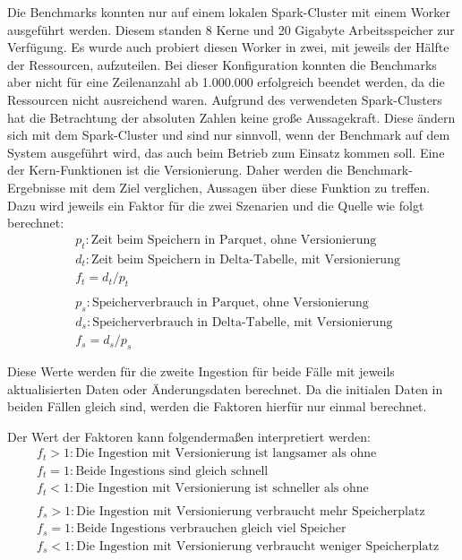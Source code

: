 Die Benchmarks konnten nur auf einem lokalen Spark-Cluster mit einem Worker ausgeführt werden.
Diesem standen 8 Kerne und 20 Gigabyte Arbeitsspeicher zur Verfügung.
Es wurde auch probiert diesen Worker in zwei, mit jeweils der Hälfte der Ressourcen, aufzuteilen.
Bei dieser Konfiguration konnten die Benchmarks aber nicht für eine Zeilenanzahl ab 1.000.000 erfolgreich beendet werden, da die Ressourcen nicht ausreichend waren.
Aufgrund des verwendeten Spark-Clusters hat die Betrachtung der absoluten Zahlen keine große Aussagekraft.
Diese ändern sich mit dem Spark-Cluster und sind nur sinnvoll, wenn der Benchmark auf dem System ausgeführt wird, das auch beim Betrieb zum Einsatz kommen soll.
Eine der Kern-Funktionen ist die Versionierung.
Daher werden die Benchmark-Ergebnisse mit dem Ziel verglichen, Aussagen über diese Funktion zu treffen.
Dazu wird jeweils ein Faktor für die zwei Szenarien und die Quelle wie folgt berechnet:
\begin{align*}
    & p_t: \text{Zeit beim Speichern in Parquet, ohne Versionierung} \\
    & d_t: \text{Zeit beim Speichern in Delta-Tabelle, mit Versionierung} \\
    & f_t = d_t / p_t \\ \\
    & p_s: \text{Speicherverbrauch in Parquet, ohne Versionierung} \\
    & d_s: \text{Speicherverbrauch in Delta-Tabelle, mit Versionierung} \\
    & f_s = d_s / p_s \\ \\
\end{align*}
Diese Werte werden für die zweite Ingestion für beide Fälle mit jeweils aktualisierten Daten oder Änderungsdaten berechnet.
Da die initialen Daten in beiden Fällen gleich sind, werden die Faktoren hierfür nur einmal berechnet.

Der Wert der Faktoren kann folgendermaßen interpretiert werden: \begin{align*} 
    & f_t > 1: \text{Die Ingestion mit Versionierung ist langsamer als ohne} \\
    & f_t = 1: \text{Beide Ingestions sind gleich schnell} \\
    & f_t < 1: \text{Die Ingestion mit Versionierung ist schneller als ohne} \\ \\
    & f_s > 1: \text{Die Ingestion mit Versionierung verbraucht mehr Speicherplatz} \\
    & f_s = 1: \text{Beide Ingestions verbrauchen gleich viel Speicher} \\
    & f_s < 1: \text{Die Ingestion mit Versionierung verbraucht weniger Speicherplatz}
\end{align*}

